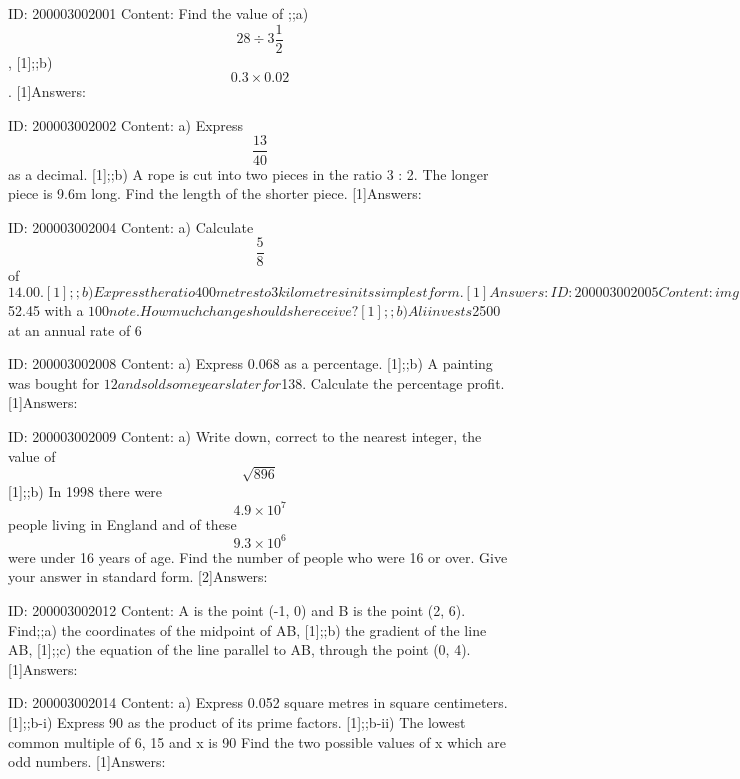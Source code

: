 \documentclass{article}
\begin{document}
ID: 200003002001
Content:
Find the value of ;;a) $$28 \div 3 \frac{1}{2}$$, [1];;b) $$0.3 \times 0.02$$. [1]Answers:

ID: 200003002002
Content:
a) Express $$\frac{13}{40}$$ as a decimal. [1];;b) A rope is cut into two pieces in the ratio 3 : 2. The longer piece is 9.6m long. Find the length of the shorter piece. [1]Answers:

ID: 200003002004
Content:
a) Calculate $$\frac{5}{8}$$ of $14.00. [1];;b) Express the ratio 400 metres to 3 kilometres in its simplest form. [1]Answers:

ID: 200003002005
Content:
img;The diagram is taken from an advertisement of a car manufacturer. It claims to show that the number of cars produced has doubled between 1990 and 1999. Explain briefly why the advertisement might be considered misleading. [2]Answers:

ID: 200003002006
Content:
a) Kim pays a bill for $52.45 with a $100 note. How much change should she receive? [1];;b) Ali invests $2500 at an annual rate of 6%

ID: 200003002008
Content:
a) Express 0.068 as a percentage. [1];;b) A painting was bought for $12 and sold some years later for $138. Calculate the percentage profit. [1]Answers:

ID: 200003002009
Content:
a) Write down, correct to the nearest integer, the value of $$\sqrt{896}$$[1];;b) In 1998 there were $$4.9 \times 10^7$$ people living in England and of these $$9.3 \times 10^6$$ were under 16 years of age. Find the number of people who were 16 or over. Give your answer in standard form. [2]Answers:

ID: 200003002012
Content:
A is the point (-1, 0) and B is the point (2, 6). Find;;a) the coordinates of the midpoint of AB, [1];;b) the gradient of the line AB, [1];;c) the equation of the line parallel to AB, through the point (0, 4). [1]Answers:

ID: 200003002014
Content:
a) Express 0.052 square metres in square centimeters. [1];;b-i) Express 90 as the product of its prime factors. [1];;b-ii) The lowest common multiple of 6, 15 and x is 90 Find the two possible values of x which are odd numbers. [1]Answers:
\end{document}
